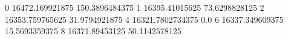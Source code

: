0 16472.169921875 150.3896484375
1 16395.41015625 73.6298828125
2 16353.759765625 31.9794921875
4 16321.7802734375 0.0
6 16337.349609375 15.5693359375
8 16371.89453125 50.1142578125
